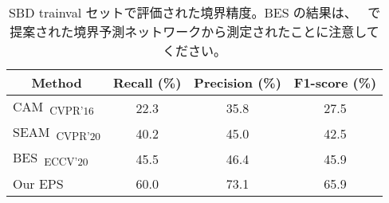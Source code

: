 \begin{table}[]
\centering
{\small
\begin{tabular}{@{}lccc@{}}
\toprule
\multicolumn{1}{c}{Method}                      & Recall (\%) & Precision (\%) & F1-score (\%) \\ \midrule
\multicolumn{1}{l}{CAM~\cite{zhou2016learning}\textsubscript{CVPR'16}} & 22.3        & 35.8           & 27.5           \\
\multicolumn{1}{l}{SEAM~\cite{wang2020self}\textsubscript{CVPR'20}}    & 40.2        & 45.0           & 42.5           \\
\multicolumn{1}{l}{BES~\cite{chen2020boundary}\textsubscript{ECCV'20}} & 45.5        & 46.4           & 45.9           \\
\multicolumn{1}{l}{Our EPS}                        & 60.0        & 73.1          & 65.9           \\ \bottomrule
\end{tabular}
}
\vspace{2mm}
\caption{SBD trainval セットで評価された境界精度。BES の結果は、~\cite{chen2020boundary} で提案された境界予測ネットワークから測定されたことに注意してください。} \vspace{-2mm}
\label{tab:boundary}
\end{table}
